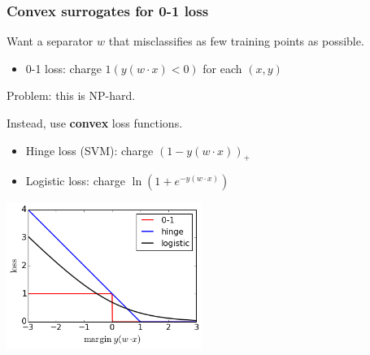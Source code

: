 \documentclass[smaller,handout]{beamer}
\def\darkred{\color{red!70!black}}
\def\vone{{\vskip.1in}}
\def\v2{{\vskip.2in}}
\begin{document}


\begin{frame}
\frametitle{Convex surrogates for 0-1 loss}

{\darkred Want a separator $w$ that misclassifies as few training points as possible. }
\begin{itemize}
\item {\darkred 0-1 loss: charge $1(y (w \cdot x) < 0)$ for each $(x,y)$}
\end{itemize}
{\darkred Problem: this is NP-hard.}

\pause\vone
Instead, use {\bf convex} loss functions.
\begin{itemize}
\item Hinge loss (SVM): charge $(1- y(w \cdot x))_+$
\item Logistic loss: charge $\ln (1 + e^{-y(w \cdot x)})$ 
\end{itemize}

\pause
\begin{center}
\includegraphics[width=2.5in]{loss-functions.png}
\end{center}

\end{frame}
\end{document}
